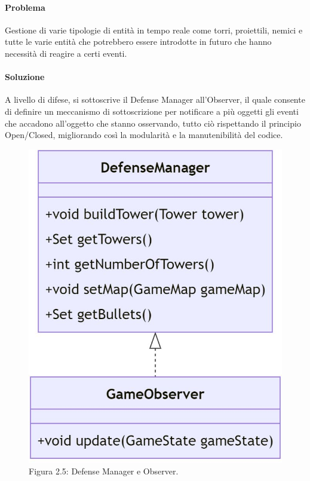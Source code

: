 \documentclass[a4paper,12pt]{report}
\begin{document}
\vspace{50mm}
\paragraph{Problema}
Gestione di varie tipologie di entità in tempo reale come torri, proiettili, nemici e tutte le varie entità che potrebbero essere introdotte in futuro che hanno necessità di reagire a certi eventi.
\paragraph{Soluzione}
A livello di difese, si sottoscrive il Defense Manager all'Observer, il quale consente di definire un meccanismo di sottoscrizione per notificare a più oggetti gli eventi che accadono all'oggetto che stanno osservando, tutto ciò rispettando il principio Open/Closed, migliorando così la modularità e la manutenibilità del codice.

\begin{figure}[H]
    \centering
    \includegraphics[width=0.8\linewidth]{defense_observer}
    \caption{Figura 2.5: Defense Manager e Observer.}
    \label{fig:defense_observer}
\end{figure}

\vspace{50mm}
\end{document}
